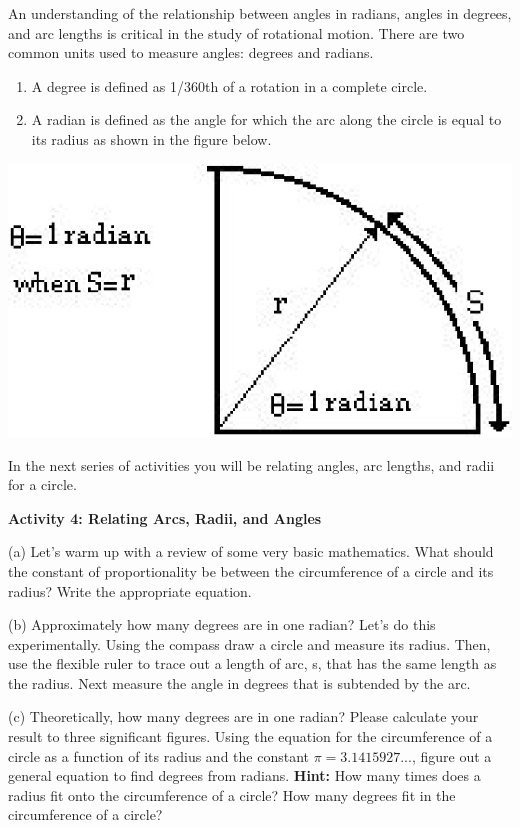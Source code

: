 An understanding of the relationship between angles in radians, angles in degrees, and arc lengths is critical in the study of rotational motion. There are two
common units used to measure angles: degrees and radians.

\begin{enumerate}
\item A degree is defined as 1/360th of a rotation in a complete circle.
\item A radian is defined as the angle for which the arc along the circle is equal to its radius as shown in the figure below.
\end{enumerate}
\vspace{0.3cm}
{\par\centering \includegraphics{rotation/rotation_fig7.eps} \par}
\vspace{0.3cm}

In the next series of activities you will be relating angles, arc lengths, and
radii for a circle.

\pagebreak[2]
\textbf{Activity 4: Relating Arcs, Radii, and Angles} 

(a) Let's warm up with a review of some very basic mathematics. What should
the constant of proportionality be between the circumference of a circle and
its radius? Write the appropriate equation.
\answerspace{10mm}

(b) Approximately how many degrees are in one radian? Let's do this experimentally.
Using the compass draw a circle and measure its radius. Then, use the flexible
ruler to trace out a length of arc, s, that has the same length as the radius.
Next measure the angle in degrees that is subtended by the arc.
\answerspace{40mm}

(c) Theoretically, how many degrees are in one radian? Please calculate your
result to three significant figures. Using the equation for the circumference
of a circle as a function of its radius and the constant $\pi=3.1415927$..., 
figure
out a general equation to find degrees from radians. \textbf{Hint:} How many
times does a radius fit onto the circumference of a circle? How many degrees
fit in the circumference of a circle?
\answerspace{20mm}

